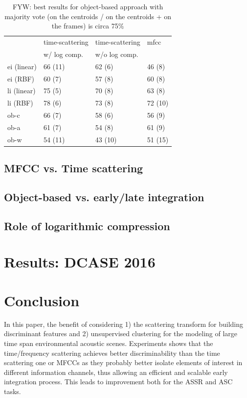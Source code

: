 \documentclass[journal]{IEEEtran}
\makeatletter
\newcommand*{\vs}{vs.\@\xspace}
\makeatother
\begin{document}
\begin{table}
\begin{center}
\begin{tabular}{llll}
                    & time-scattering & time-scattering & mfcc \\
                    & w/ log comp.    & w/o log comp.   &      \\
             \hline
ei (linear)  & 66 (11)        & 62 (6)  & 46 (8)    \\
ei (RBF)     & 60 (7)         & 57 (8)  & 60 (8)    \\
li (linear)  & 75 (5)         & 70 (8)  & 63 (8)   \\
li (RBF)     & 78 (6)         & 73 (8)  & 72 (10)   \\
ob-c         & 66 (7)         & 58 (6)  & 56 (9)   \\
ob-a         & 61 (7)         & 54 (8)  & 61 (9)   \\
ob-w         & 54 (11)        & 43 (10) & 51 (15)   \\
\end{tabular}
\caption{FYW: best results for object-based approach with majority vote (on the centroids / on the centroids + on the frames) is circa 75\%}
\end{center}
\end{table}

\subsection{MFCC \vs Time scattering}

\subsection{Object-based \vs early/late integration}

\subsection{Role of logarithmic compression}

\section{Results: DCASE 2016}

\section{Conclusion}

In this paper, the benefit of considering 1) the scattering transform for building discriminant features and 2) unsupervised clustering for the modeling of large time span environmental acoustic scenes. Experiments shows that the time/frequency scattering achieves better discriminability than the time scattering one or MFCCs as they probably better isolate elements of interest in different information channels, thus allowing an efficient and scalable early integration process. This leads to improvement both for the ASSR and ASC tasks.
\end{document}
